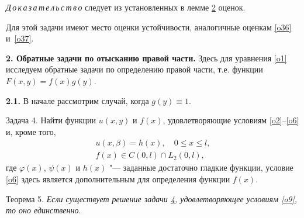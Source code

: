 \smallskip

\textit{Д\,о\,к\,а\,з\,а\,т\,е\,л\,ь\,с\,т\,в\,о\/}  следует из установленных в лемме \hyperlink{sab:lemma2}{2} оценок.

\smallskip

Для этой задачи имеют место оценки  устойчивости, аналогичные оценкам \eqref{o36} и~\eqref{o37}.




\bigskip
\textbf{2. Обратные задачи по отысканию правой части.}
Здесь для уравнения \eqref{o1} исследуем обратные задачи по определению правой части, т.е. функции $F(x,y)=f(x)g(y)$.

\smallskip

\hypertarget{sab:p2.1}{}

\textbf{2.1.} В начале рассмотрим случай, когда $g(y)\equiv1$.

\smallskip

\hypertarget{sab:task4}{}

{\small\sc Задача 4.} Найти функции $u(x,y)$ и $f(x)$, удовлетворяющие условиям \eqref{o2}--\eqref{o6} и, кроме того,
\begin{gather}
\label{o42}
u(x,\beta)=h(x),\quad  0\leq x\leq l,
\\
\label{o43}
f(x)\in C(0,l)\cap L_2(0,l),
\end{gather}
где $\varphi(x)$, $\psi(x)$ и $h(x)$ "--- заданные достаточно гладкие функции, условие \eqref{o6} здесь является дополнительным для определения функции $f(x)$.

\smallskip

\hypertarget{sab:th5}{}

{\small \sc Теорема 5.} \textit{Если существует решение задачи {\em \hyperlink{sab:task4}{4},} удовлетворяющее условиям {\em \eqref{o9},} то оно единственно}.

\smallskip


